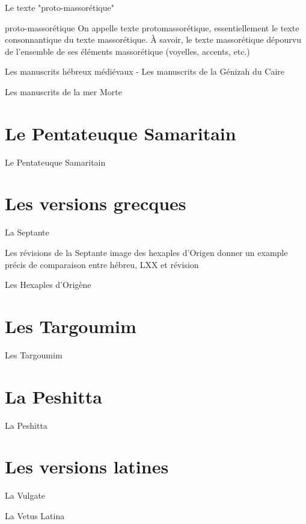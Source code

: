 \documentclass[11pt]{beamer}
\begin{document}
\begin{frame}{Le texte "proto-massorétique"}
\begin{alertblock}{proto-massorétique}
    On appelle texte protomassorétique, essentiellement le texte consonnantique du texte massorétique. À savoir, le texte massorétique dépourvu de l'ensemble de ses éléments massorétique (voyelles, accents, etc.)
\end{alertblock}    
\end{frame}

\begin{frame}{Les manuscrits hébreux médiévaux - Les manuscrits de la Génizah du Caire}
\end{frame}

\begin{frame}{Les manuscrits de la mer Morte}    
\end{frame}

\section{Le Pentateuque Samaritain}
\begin{frame}{Le Pentateuque Samaritain}
\end{frame}

\section{Les versions grecques}
\begin{frame}{La Septante}
\end{frame}

\begin{frame}{Les révisions de la Septante}
    image des hexaples d'Origen
    donner un example précis de comparaison entre hébreu, LXX et révision
\end{frame}

\begin{frame}{Les Hexaples d'Origène}
    
\end{frame}

\section{Les Targoumim}
\begin{frame}{Les Targoumim}
\end{frame}

\section{La Peshitta}
\begin{frame}{La Peshitta}
\end{frame}

\section{Les versions latines}
\begin{frame}{La Vulgate}    
\end{frame}

\begin{frame}{La Vetus Latina}
\end{frame}
\end{document}

